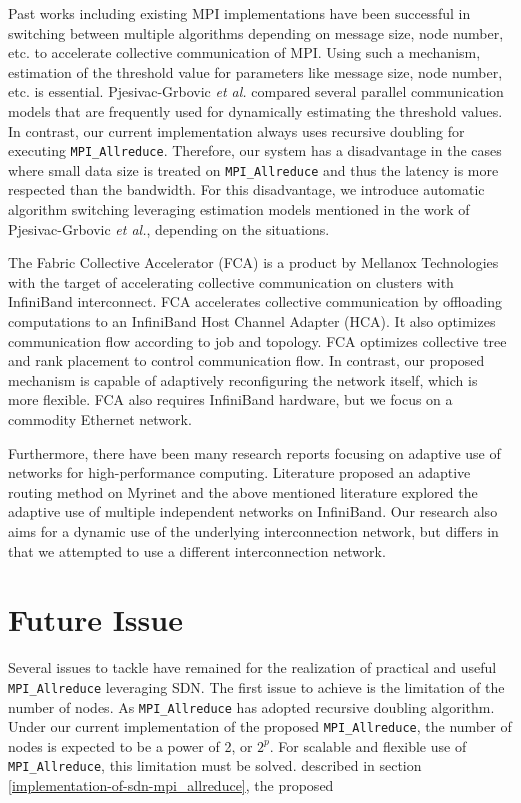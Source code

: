 Past works including existing MPI implementations have been successful
in switching between multiple algorithms depending on message size, node
number, etc. to accelerate collective communication of MPI. Using such a
mechanism, estimation of the threshold value for parameters like message
size, node number, etc. is essential. Pjesivac-Grbovic \emph{et al.}
\cite{PjesivacGrbovic} compared several parallel communication models
that are frequently used for dynamically estimating the threshold
values. In contrast, our current implementation always uses recursive
doubling for executing \texttt{MPI\_Allreduce}. Therefore, our system
has a disadvantage in the cases where small data size is treated on
\texttt{MPI\_Allreduce} and thus the latency is more respected than the
bandwidth. For this disadvantage, we introduce automatic algorithm
switching leveraging estimation models mentioned in the work of
Pjesivac-Grbovic \emph{et al.}, depending on the situations.

The Fabric Collective Accelerator (FCA) \cite{fca} is a product by
Mellanox Technologies with the target of accelerating collective
communication on clusters with InfiniBand interconnect. FCA accelerates
collective communication by offloading computations to an InfiniBand
Host Channel Adapter (HCA). It also optimizes communication flow
according to job and topology. FCA optimizes collective tree and rank
placement to control communication flow. In contrast, our proposed
mechanism is capable of adaptively reconfiguring the network itself,
which is more flexible. FCA also requires InfiniBand hardware, but we
focus on a commodity Ethernet network.

Furthermore, there have been many research reports focusing on adaptive
use of networks for high-performance computing. Literature
\cite{Geoffray2008} proposed an adaptive routing method on Myrinet and
the above mentioned literature \cite{Jiuxing2004} explored the adaptive
use of multiple independent networks on InfiniBand. Our research also
aims for a dynamic use of the underlying interconnection network, but
differs in that we attempted to use a different interconnection network.

\hypertarget{future-issue}{%
\section{Future Issue}\label{future-issue}}

Several issues to tackle have remained for the realization of practical
and useful \texttt{MPI\_Allreduce} leveraging SDN. The first issue to
achieve is the limitation of the number of nodes. As
\texttt{MPI\_Allreduce} has adopted recursive doubling algorithm. Under
our current implementation of the proposed \texttt{MPI\_Allreduce}, the
number of nodes is expected to be a power of 2, or \(2^p\). For scalable
and flexible use of \texttt{MPI\_Allreduce}, this limitation must be
solved. described in section \ref{implementation-of-sdn-mpi_allreduce},
the proposed

